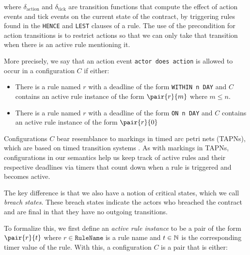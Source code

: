 \documentclass{article}
\begin{document}
where $\delta_\text{action}$ and $\delta_\text{tick}$ are transition functions
that compute the effect of action events and tick events on the current state
of the contract, by triggering rules found in the \texttt{HENCE} and
\texttt{LEST} clauses of a rule.
The use of the precondition for action transitions is to restrict actions so
that we can only take that transition when there is an active rule mentioning it.

More precisely, we say that an action event \texttt{actor does action} is allowed
to occur in a configuration $C$ if either:

\begin{itemize}
  \item
  There is a rule named $r$ with a deadline of the form
  \texttt{WITHIN n DAY}
  and $C$ contains an active rule instance of the form
  $\pair{r}{m}$ where $m \leq n$.

  \item
  There is a rule named $r$ with a deadline of the form
  \texttt{ON n DAY}
  and $C$ contains an active rule instance of the form
  $\pair{r}{0}$
\end{itemize}

Configurations $C$ bear resemblance to markings in timed arc petri nets
(TAPNs), which are based on timed transition systems .
As with markings in TAPNs, configurations in our semantics help us keep
track of active rules and their respective deadlines via timers that count down
when a rule is triggered and becomes active.

The key difference is that we also have a notion of critical states, which we
call \textit{breach states}.
These breach states indicate the actors who breached the contract and are final
in that they have no outgoing transitions.



To formalize this, we first define an \textit{active rule instance} to be a
pair of the form $\pair{r}{t}$ where $r \in \texttt{RuleName}$ is a rule name
and $t \in \operatorname{\mathbb{N}}$ is the corresponding timer value of the rule.
With this, a configuration $C$ is a pair that is either:
\end{document}
